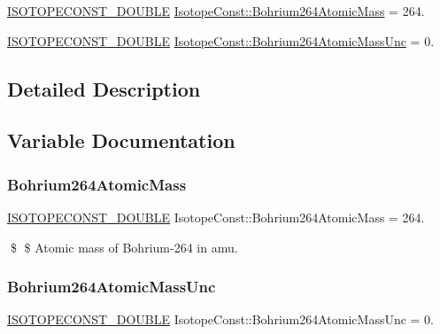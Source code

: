 \begin{DoxyCompactItemize}
\item 
\mbox{\hyperlink{group___isotope_const-_macros_ga8f45a7272ce02c0b4c65c44636ed719a}{I\+S\+O\+T\+O\+P\+E\+C\+O\+N\+S\+T\+\_\+\+D\+O\+U\+B\+LE}} \mbox{\hyperlink{group___isotope_const-_bohrium-_bh264_ga54e45619d1e210f7142fa8fe3d654dda}{Isotope\+Const\+::\+Bohrium264\+Atomic\+Mass}} = 264.
\item 
\mbox{\hyperlink{group___isotope_const-_macros_ga8f45a7272ce02c0b4c65c44636ed719a}{I\+S\+O\+T\+O\+P\+E\+C\+O\+N\+S\+T\+\_\+\+D\+O\+U\+B\+LE}} \mbox{\hyperlink{group___isotope_const-_bohrium-_bh264_ga0bd22e4a3b71ac165d7ebe947631436e}{Isotope\+Const\+::\+Bohrium264\+Atomic\+Mass\+Unc}} = 0.
\end{DoxyCompactItemize}


\subsection{Detailed Description}


\subsection{Variable Documentation}
\mbox{\label{group___isotope_const-_bohrium-_bh264_ga54e45619d1e210f7142fa8fe3d654dda}} 
\subsubsection{\texorpdfstring{Bohrium264\+Atomic\+Mass}{Bohrium264AtomicMass}}
{\footnotesize\ttfamily \mbox{\hyperlink{group___isotope_const-_macros_ga8f45a7272ce02c0b4c65c44636ed719a}{I\+S\+O\+T\+O\+P\+E\+C\+O\+N\+S\+T\+\_\+\+D\+O\+U\+B\+LE}} Isotope\+Const\+::\+Bohrium264\+Atomic\+Mass = 264.}

\$ \$ Atomic mass of Bohrium-\/264 in amu. \mbox{\label{group___isotope_const-_bohrium-_bh264_ga0bd22e4a3b71ac165d7ebe947631436e}} 
\subsubsection{\texorpdfstring{Bohrium264\+Atomic\+Mass\+Unc}{Bohrium264AtomicMassUnc}}
{\footnotesize\ttfamily \mbox{\hyperlink{group___isotope_const-_macros_ga8f45a7272ce02c0b4c65c44636ed719a}{I\+S\+O\+T\+O\+P\+E\+C\+O\+N\+S\+T\+\_\+\+D\+O\+U\+B\+LE}} Isotope\+Const\+::\+Bohrium264\+Atomic\+Mass\+Unc = 0.}

